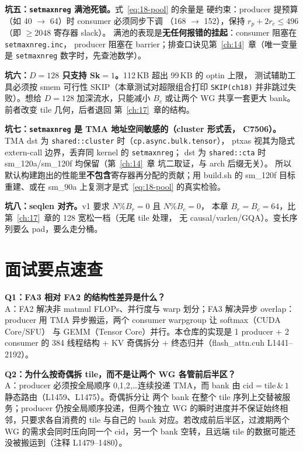 \textbf{坑五：\texttt{setmaxnreg} 满池死锁。}式~\ref{eq:18-pool} 的余量是
硬约束：producer 提预算（如 40 $\to$ 64）时 consumer 必须同步下调
（168 $\to$ 152），保持 $r_p + 2r_c \le 496$（即 $\ge 2048$ 寄存器 slack）。
满池的表现是\textbf{无任何报错的挂起}：consumer 阻塞在 \texttt{setmaxnreg.\allowbreak{}inc}，
producer 阻塞在 barrier；排查口诀见第~\ref{ch:14}~章（唯一变量是
\texttt{setmaxnreg} 数字时，先查池数学）。

\textbf{坑六：$D{=}128$ 只支持 Sk$=1$。}\allowbreak{}112\,KB 超出 99\,KB 的 optin 上限，
测试辅助工具必须按 smem 可行性 SKIP（本章测试对超限组合打印
\texttt{SKIP(ch18)} 并非跳过失败）。想给 $D{=}128$ 加深流水，只能减小
$B_c$ 或让两个 WG 共享一套更大 bank。前者改变 tile 几何，后者退回
第~\ref{ch:17}~章的结构。

\textbf{坑七：\texttt{setmaxnreg} 是 TMA 地址空间敏感的（cluster 形式丢，
C7506）。}\allowbreak{}TMA dst 为 \texttt{shared::cluster} 时（\texttt{cp.\allowbreak{}async.\allowbreak{}bulk.\allowbreak{}tensor}），
ptxas 视其为隐式 extern-call 边界，丢弃同 kernel 的 \texttt{setmaxnreg}；
dst 为 \texttt{shared::cta} 时 sm\_120a/sm\_120f 均保留（第~\ref{ch:14}~章
坑二取证，与 arch 后缀无关）。
所以默认构建跑出的性能里\textbf{不包含}寄存器再分配的贡献；用 build.sh
的 sm\_120f 目标重建、或在 sm\_90a 上复测才是式~\ref{eq:18-pool} 的真实检验。

\textbf{坑八：seqlen 对齐。}\allowbreak{}v1 要求 $N \% B_r = 0$ 且 $N \% B_c = 0$，
本章 $B_r = B_c = 64$，比第~\ref{ch:17}~章的 128 宽松一档（无尾 tile 处理，
无 causal/varlen/GQA）。变长序列要么 pad，要么走分桶。

\section{面试要点速查}

\textbf{Q1：FA3 相对 FA2 的结构性差异是什么？}\\
A：FA2 解决非 matmul FLOPs、并行度与 warp 划分；FA3 解决异步 overlap：
producer 用 TMA 异步搬运，两个 consumer warpgroup 让 softmax（CUDA Core/SFU）
与 GEMM（Tensor Core）并行。本仓库的实现是 1 producer $+$ 2 consumer 的
384 线程结构 $+$ KV 奇偶拆分 $+$ 终态归并（flash\_attn.cuh L1441--2192）。

\textbf{Q2：为什么按奇偶拆 tile，而不是让两个 WG 各管前后半区？}\\
A：producer 必须按全局顺序 0,1,2,\dots 连续投递 TMA，而 bank 由
$\mathrm{cid} = \mathrm{tile}\,\&\,1$ 静态路由（L1459、L1475）。奇偶拆分让
两个 bank 在整个 tile 序列上交替被服务；producer 仍按全局顺序投递，但两个独立 WG
的瞬时进度并不保证始终相邻，只要求各自消费的 tile 与自己的 bank 对应。若改成前后半区，过渡期两个 WG 的需求会同时压向同一个
cid，另一个 bank 空转，且远端 tile 的数据可能还没被搬运到（注释 L1479--1480）。

